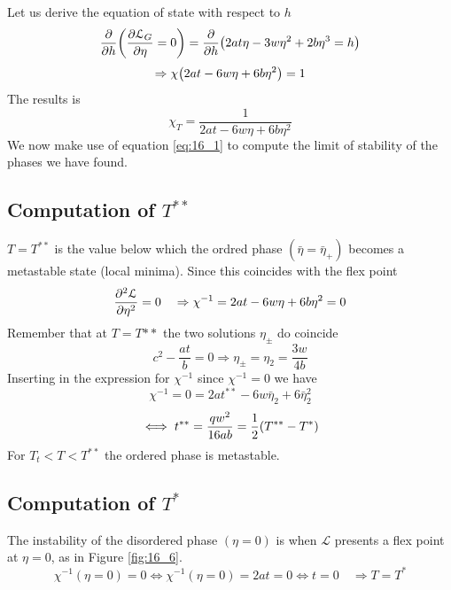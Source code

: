 \documentclass[../main/main.tex]{subfiles}
\begin{document}
Let us derive the equation of state with respect to \( h \)
\begin{equation}
  \pdv{}{h} \qty(\pdv{\mathcal{L}_G}{\eta } = 0 )   = \pdv{}{h} \qty(2 a t \eta - 3 w \eta ^2 + 2 b \eta ^3 = h)
\end{equation}
\begin{equation}
  \Rightarrow \chi \qty(2 a t - 6 w \eta + 6 b \eta ^2 ) =1
\end{equation}
The results is
\begin{equation}
  \chi _T = \frac{1}{2 a t - 6 w \eta + 6 b \eta ^2}
  \label{eq:16_1}
\end{equation}
We now make use of equation \eqref{eq:16_1} to compute the limit of stability of the phases we have found.

\subsection{Computation of \( T^{**} \) }
\( T=T^{**} \) is the value below which the ordred phase \( (\bar{\eta } = \bar{\eta }_+ ) \) becomes a metastable state (local minima). Since this coincides with the flex point
\begin{equation}
  \pdv[2]{\mathcal{L}}{\eta } = 0 \quad \Rightarrow \chi ^{-1} = 2 a t - 6 w \eta + 6 b \eta ^2 = 0
\end{equation}
Remember that at \( T=T{**} \)  the two solutions \( \eta _\pm \) do coincide
\begin{equation}
  c^2 - \frac{at}{b} = 0 \Rightarrow \eta _\pm = \eta _2 = \frac{3 w}{4 b}
\end{equation}
Inserting in the expression for \( \chi ^{-1} \) since \( \chi ^{-1} =0 \) we have
\begin{equation}
  \chi ^{-1} = 0 = 2 a t^{**} - 6 w \bar{\eta }_2 + 6 \bar{\eta }_2^2
\end{equation}
\begin{equation}
  \iff t^{**} = \frac{q w^2}{16 a b} = \frac{1}{2} \qty(T^{**}-T^*)
\end{equation}
For \( T_t < T < T^{**} \) the ordered phase is metastable.

\subsection{Computation of \( T^* \)}
The instability of the disordered phase \( (\eta =0) \) is when \( \mathcal{L} \) presents a flex point at \( \eta =0 \), as in Figure \ref{fig:16_6}.
\begin{equation}
  \chi ^{-1} (\eta =0) = 0 \iff \chi ^{-1} (\eta =0) = 2 a t = 0 \iff t = 0 \quad \Rightarrow T = T^*
\end{equation}
\end{document}
